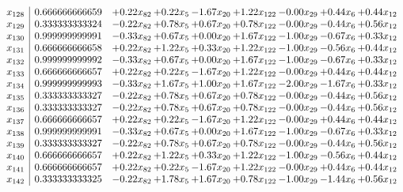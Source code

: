 \documentclass[8pt]{article}
\begin{document}
\[\begin{array}{c| c c@{\hskip 2pt} c@{\hskip 2pt} c@{\hskip 2pt} c@{\hskip 2pt} c@{\hskip 2pt} c@{\hskip 2pt} c@{\hskip 2pt} }
 x_{128}   &  0.666666666659 & +  0.22 x_{82} & +  0.22 x_{5} & -1.67 x_{20} & +  1.22 x_{122} & -0.00 x_{29} & +  0.44 x_{6} & +  0.44 x_{12}\\
 x_{129}   &  0.333333333324 & -0.22 x_{82} & +  0.78 x_{5} & +  0.67 x_{20} & +  0.78 x_{122} & -0.00 x_{29} & -0.44 x_{6} & +  0.56 x_{12}\\
 x_{130}   &  0.999999999991 & -0.33 x_{82} & +  0.67 x_{5} & +  0.00 x_{20} & +  1.67 x_{122} & -1.00 x_{29} & -0.67 x_{6} & +  0.33 x_{12}\\
 x_{131}   &  0.666666666658 & +  0.22 x_{82} & +  1.22 x_{5} & +  0.33 x_{20} & +  1.22 x_{122} & -1.00 x_{29} & -0.56 x_{6} & +  0.44 x_{12}\\
 x_{132}   &  0.999999999992 & -0.33 x_{82} & +  0.67 x_{5} & +  0.00 x_{20} & +  1.67 x_{122} & -1.00 x_{29} & -0.67 x_{6} & +  0.33 x_{12}\\
 x_{133}   &  0.666666666657 & +  0.22 x_{82} & +  0.22 x_{5} & -1.67 x_{20} & +  1.22 x_{122} & -0.00 x_{29} & +  0.44 x_{6} & +  0.44 x_{12}\\
 x_{134}   &  0.999999999993 & -0.33 x_{82} & +  1.67 x_{5} & +  1.00 x_{20} & +  1.67 x_{122} & -2.00 x_{29} & -1.67 x_{6} & +  0.33 x_{12}\\
 x_{135}   &  0.333333333327 & -0.22 x_{82} & +  0.78 x_{5} & +  0.67 x_{20} & +  0.78 x_{122} & -0.00 x_{29} & -0.44 x_{6} & +  0.56 x_{12}\\
 x_{136}   &  0.333333333327 & -0.22 x_{82} & +  0.78 x_{5} & +  0.67 x_{20} & +  0.78 x_{122} & -0.00 x_{29} & -0.44 x_{6} & +  0.56 x_{12}\\
 x_{137}   &  0.666666666657 & +  0.22 x_{82} & +  0.22 x_{5} & -1.67 x_{20} & +  1.22 x_{122} & -0.00 x_{29} & +  0.44 x_{6} & +  0.44 x_{12}\\
 x_{138}   &  0.999999999991 & -0.33 x_{82} & +  0.67 x_{5} & +  0.00 x_{20} & +  1.67 x_{122} & -1.00 x_{29} & -0.67 x_{6} & +  0.33 x_{12}\\
 x_{139}   &  0.333333333327 & -0.22 x_{82} & +  0.78 x_{5} & +  0.67 x_{20} & +  0.78 x_{122} & -0.00 x_{29} & -0.44 x_{6} & +  0.56 x_{12}\\
 x_{140}   &  0.666666666657 & +  0.22 x_{82} & +  1.22 x_{5} & +  0.33 x_{20} & +  1.22 x_{122} & -1.00 x_{29} & -0.56 x_{6} & +  0.44 x_{12}\\
 x_{141}   &  0.666666666657 & +  0.22 x_{82} & +  0.22 x_{5} & -1.67 x_{20} & +  1.22 x_{122} & -0.00 x_{29} & +  0.44 x_{6} & +  0.44 x_{12}\\
 x_{142}   &  0.333333333325 & -0.22 x_{82} & +  1.78 x_{5} & +  1.67 x_{20} & +  0.78 x_{122} & -1.00 x_{29} & -1.44 x_{6} & +  0.56 x_{12}\\

\end{array}\]
\end{document}
